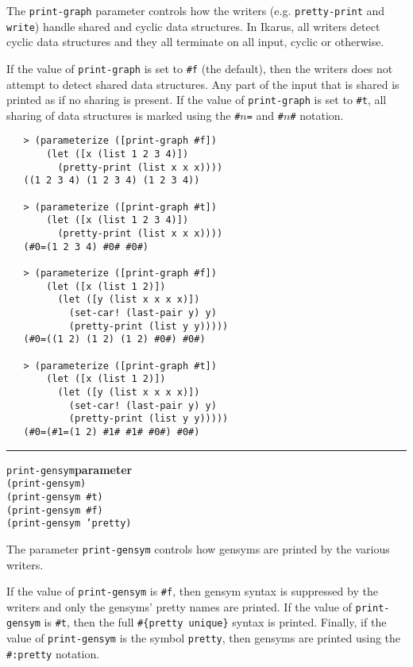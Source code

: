 \documentclass[onecolumn, 12pt, twoside, openright, dvipdfm]{book}
\makeatletter
\newcommand{\idxlabeldefun}[5]{
\vspace{1ex}
\rule{\textwidth}{2pt}
{\phantomsection\index{#1@\texttt{#2}}\label{#3}{\Large\texttt{#4}}\hfill\textbf{#5}}\\}
\newcommand{\idxdefun}[3]{\idxlabeldefun{#1}{#2}{#1}{#2}{#3}}
\newcommand{\defun}[2]{\idxdefun{#1}{#1}{#2}}
\makeatother
\begin{document}
The \texttt{print-graph} parameter controls how the writers (e.g.
\texttt{pretty-print} and \texttt{write}) handle shared and cyclic
data structures.  In Ikarus, all writers detect cyclic data
structures and they all terminate on all input, cyclic or otherwise.

If the value of \texttt{print-graph} is set to \texttt{\#f} (the
default), then the writers does not attempt to detect shared data
structures.  Any part of the input that is shared is printed as if
no sharing is present.
If the value of \texttt{print-graph} is set to \texttt{\#t}, all
sharing of data structures is marked using the \texttt{\#$n$=} and
\texttt{\#$n$\#} notation. 


\begin{verbatim}
   > (parameterize ([print-graph #f])
       (let ([x (list 1 2 3 4)])
         (pretty-print (list x x x))))
   ((1 2 3 4) (1 2 3 4) (1 2 3 4))

   > (parameterize ([print-graph #t])
       (let ([x (list 1 2 3 4)])
         (pretty-print (list x x x))))
   (#0=(1 2 3 4) #0# #0#)

   > (parameterize ([print-graph #f])
       (let ([x (list 1 2)])
         (let ([y (list x x x x)])
           (set-car! (last-pair y) y)
           (pretty-print (list y y)))))
   (#0=((1 2) (1 2) (1 2) #0#) #0#)

   > (parameterize ([print-graph #t])
       (let ([x (list 1 2)])
         (let ([y (list x x x x)])
           (set-car! (last-pair y) y)
           (pretty-print (list y y)))))
   (#0=(#1=(1 2) #1# #1# #0#) #0#)
\end{verbatim}




\defun{print-gensym}{parameter}
\texttt{(print-gensym)}\\
\texttt{(print-gensym \#t)}\\
\texttt{(print-gensym \#f)}\\
\texttt{(print-gensym 'pretty)}

The parameter \texttt{print-gensym} controls how gensyms are printed
by the various writers.  

If the value of \texttt{print-gensym} is \texttt{\#f}, then gensym
syntax is suppressed by the writers and only the gensyms' pretty
names are printed.  If the value of \texttt{print-gensym} is
\texttt{\#t}, then the full \verb|#{pretty unique}| syntax is
printed.  Finally, if the value of \texttt{print-gensym} is the
symbol \texttt{pretty}, then gensyms are printed using the
\texttt{\#:pretty} notation.  
\end{document}
